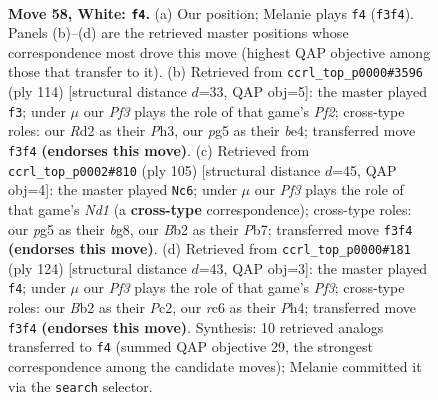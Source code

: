 \documentclass[11pt]{article}
\begin{document}
\clearpage

\begin{figure}[p]\centering
\begin{subfigure}{0.46\textwidth}\centering
\resizebox{\linewidth}{!}{%
\newchessgame
\chessboard[
  setfen={8/4p1k1/npr4p/pN4p1/P1p5/2P2PK1/1B1R4/8 w - - 4 58},
  showmover=false,
  pgfstyle=straightmove, color=movearrow, markmove={f3-f4}
]}
\caption{}
\end{subfigure}\hfill
\begin{subfigure}{0.46\textwidth}\centering
\resizebox{\linewidth}{!}{%
\newchessgame
\chessboard[
  setfen={6k1/R7/1p3r1p/4N1p1/P2Pbp2/7P/4KP2/8 w - - 8 58},
  showmover=false,
  pgfstyle=straightmove, color=movearrow, markmove={f2-f3}
]}
\caption{}
\end{subfigure}
\\[4pt]
\begin{subfigure}{0.46\textwidth}\centering
\resizebox{\linewidth}{!}{%
\newchessgame
\chessboard[
  setfen={3n2B1/1pk3p1/7p/r2pP2P/P2P2P1/2K5/8/3R4 b - - 6 53},
  showmover=false,
  pgfstyle=straightmove, color=movearrow, markmove={d8-c6}
]}
\caption{}
\end{subfigure}\hfill
\begin{subfigure}{0.46\textwidth}\centering
\resizebox{\linewidth}{!}{%
\newchessgame
\chessboard[
  setfen={5R2/3r3p/2p3p1/2k1p1P1/3p3P/3P1PK1/2P5/8 w - - 17 63},
  showmover=false,
  pgfstyle=straightmove, color=movearrow, markmove={f3-f4}
]}
\caption{}
\end{subfigure}
\caption{\textbf{Move 58, White: \texttt{f4}.} (a) Our position; Melanie plays \texttt{f4} (\texttt{f3f4}). Panels (b)--(d) are the retrieved master positions whose correspondence most drove this move (highest QAP objective among those that transfer to it). (b) Retrieved from \texttt{ccrl\_top\_p0000\#3596} (ply 114) [structural distance $d$=33, QAP obj=5]: the master played \texttt{f3}; under $\mu$ our \emph{Pf3} plays the role of that game's \emph{Pf2}; cross-type roles: our \emph{R}d2 as their \emph{P}h3, our \emph{p}g5 as their \emph{b}e4; transferred move \texttt{f3f4} \textbf{(endorses this move)}. (c) Retrieved from \texttt{ccrl\_top\_p0002\#810} (ply 105) [structural distance $d$=45, QAP obj=4]: the master played \texttt{Nc6}; under $\mu$ our \emph{Pf3} plays the role of that game's \emph{Nd1} (a \textbf{cross-type} correspondence); cross-type roles: our \emph{p}g5 as their \emph{b}g8, our \emph{B}b2 as their \emph{P}b7; transferred move \texttt{f3f4} \textbf{(endorses this move)}. (d) Retrieved from \texttt{ccrl\_top\_p0000\#181} (ply 124) [structural distance $d$=43, QAP obj=3]: the master played \texttt{f4}; under $\mu$ our \emph{Pf3} plays the role of that game's \emph{Pf3}; cross-type roles: our \emph{B}b2 as their \emph{P}c2, our \emph{r}c6 as their \emph{P}h4; transferred move \texttt{f3f4} \textbf{(endorses this move)}. Synthesis: 10 retrieved analogs transferred to \texttt{f4} (summed QAP objective 29, the strongest correspondence among the candidate moves); Melanie committed it via the \texttt{search} selector.}
\label{fig:thought-m114}
\end{figure}
\end{document}
